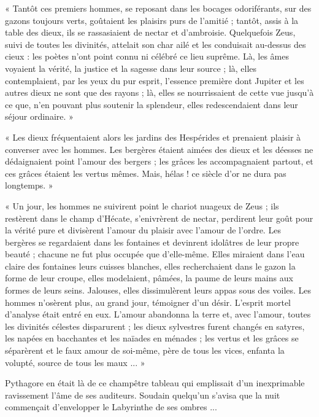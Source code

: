 \documentclass[a4paper, 11pt, oneside, polutonikogreek, french]{article}
\begin{document}
« Tantôt ces premiers hommes, se reposant dans les bocages odoriférants, sur des gazons toujours verts, goûtaient les plaisirs purs de l'amitié ; tantôt, assis à la table des dieux, ils se rassasiaient de nectar et d'ambroisie. Quelquefois Zeus, suivi de toutes les divinités, attelait son char ailé et les conduisait au-dessus des cieux : les poètes n'ont point connu ni célébré ce lieu suprême. Là, les âmes voyaient la vérité, la justice et la sagesse dans leur source ; là, elles contemplaient, par les yeux du pur esprit, l'essence première dont Jupiter et les autres dieux ne sont que des rayons ; là, elles se nourrissaient de cette vue jusqu'à ce que, n'en pouvant plus soutenir la splendeur, elles redescendaient dans leur séjour ordinaire. »

« Les dieux fréquentaient alors les jardins des Hespérides et prenaient plaisir à converser avec les hommes. Les bergères étaient aimées des dieux et les déesses ne dédaignaient point l'amour des bergers ; les grâces les accompagnaient partout, et ces grâces étaient les vertus mêmes. Mais, hélas ! ce siècle d'or ne dura pas longtemps. »

« Un jour, les hommes ne suivirent point le chariot nuageux de Zeus ; ils restèrent dans le champ d'Hécate, s'enivrèrent de nectar, perdirent leur goût pour la vérité pure et divisèrent l'amour du plaisir avec l'amour de l'ordre. Les bergères se regardaient dans les fontaines et devinrent idolâtres de leur propre beauté ; chacune ne fut plus occupée que d'elle-même. Elles miraient dans l'eau claire des fontaines leurs cuisses blanches, elles recherchaient dans le gazon la forme de leur croupe, elles modelaient, pâmées, la paume de leurs mains aux formes de leurs seins. Jalouses, elles dissimulèrent leurs appas sous des voiles. Les hommes n'osèrent plus, au grand jour, témoigner d'un désir. L'esprit mortel d'analyse était entré en eux. L'amour abandonna la terre et, avec l'amour, toutes les divinités célestes disparurent ; les dieux sylvestres furent changés en satyres, les napées en bacchantes et les naïades en ménades ; les vertus et les grâces se séparèrent et le faux amour de soi-même, père de tous les vices, enfanta la volupté, source de tous les maux ... »

\bigskip
\centerline{\EightStarTaper}
\centerline{\EightStarTaper\EightStarTaper}
\bigskip

Pythagore en était là de ce champêtre tableau qui emplissait d'un inexprimable ravissement l'âme de ses auditeurs. Soudain quelqu'un s'avisa que la nuit commençait d'envelopper le Labyrinthe de ses ombres ...
\end{document}
